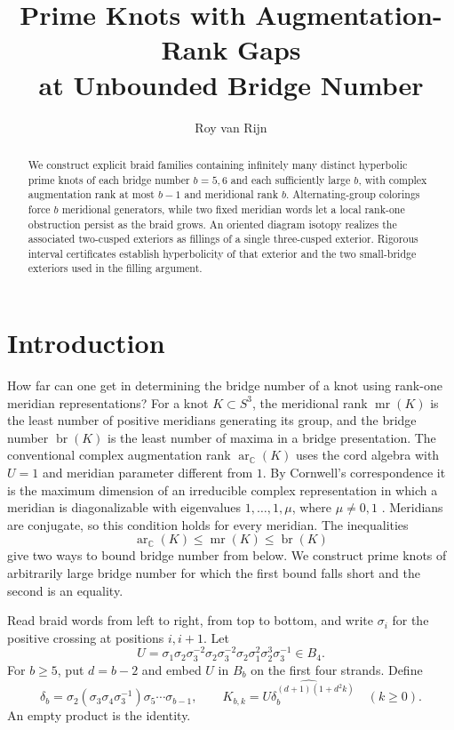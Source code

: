 \documentclass[11pt]{article}
\title{Prime Knots with Augmentation-Rank Gaps\\ at Unbounded Bridge Number}
\author{Roy van Rijn}
\date{}
\theoremstyle{remark}
\newcommand{\ar}{\operatorname{ar}_{\mathbb C}}
\newcommand{\mr}{\operatorname{mr}}
\newcommand{\br}{\operatorname{br}}
\newcommand{\cl}[1]{\widehat{#1}}
\begin{document}
\maketitle

\begin{abstract}
We construct explicit braid families containing infinitely many distinct
hyperbolic prime knots of each bridge number \(b=5,6\) and each sufficiently
large \(b\), with complex augmentation rank at most \(b-1\) and meridional
rank \(b\). Alternating-group colorings force \(b\) meridional generators,
while two fixed meridian words let a local rank-one obstruction
persist as the braid grows. An oriented diagram isotopy realizes the
associated two-cusped exteriors as fillings of a single three-cusped
exterior. Rigorous interval certificates establish
hyperbolicity of that exterior and the two small-bridge exteriors used
in the filling argument.
\end{abstract}

\section{Introduction}

How far can one get in determining the bridge number of a knot using
rank-one meridian representations? For a knot \(K\subset S^3\), the
meridional rank \(\mr(K)\) is the least number of positive meridians
generating its group, and the bridge number \(\br(K)\) is the least
number of maxima in a bridge presentation. The conventional complex
augmentation rank \(\ar(K)\) uses the cord algebra with \(U=1\) and
meridian parameter different from \(1\). By Cornwell's correspondence it
is the maximum dimension of an irreducible complex representation in
which a meridian is diagonalizable with eigenvalues \(1,\ldots,1,\mu\),
where \(\mu\ne 0,1\) \cite[Theorem 1.2 and Definition 1.8]{Cornwell}.
Meridians are conjugate, so this condition holds for every meridian.
The inequalities
\[
                 \ar(K)\le \mr(K)\le\br(K)
\]
give two ways to bound bridge number from below. We construct prime
knots of arbitrarily large bridge number for which the first bound
falls short and the second is an equality.

Read braid words from left to right, from top to bottom, and write
\(\sigma_i\) for the positive crossing at positions \(i,i+1\).
Let
\[
 U=\sigma_1\sigma_2\sigma_3^{-2}\sigma_2\sigma_3^{-2}
          \sigma_2\sigma_1^2\sigma_2^3\sigma_3^{-1}\in B_4.
\]
For \(b\ge5\), put \(d=b-2\) and embed \(U\) in \(B_b\) on the first
four strands. Define
\[
 \delta_b=\sigma_2(\sigma_3\sigma_4\sigma_3^{-1})
                  \sigma_5\cdots\sigma_{b-1},\qquad
 K_{b,k}=\cl{U\delta_b^{(d+1)(1+d^2 k)}}\quad (k\ge0).
\]
An empty product is the identity.
\end{document}
